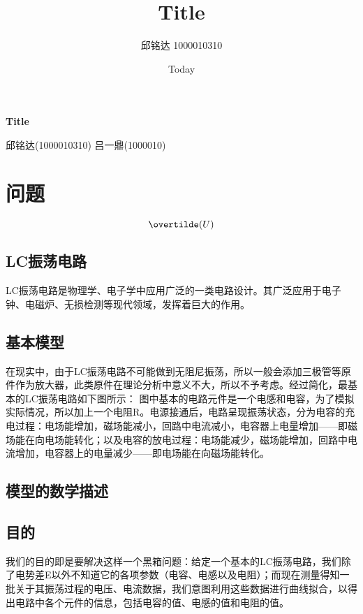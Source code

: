 \documentclass[a4paper]{article}
\begin{document}
\title{Title}
\author{邱铭达 1000010310}
\date{Today}

%
%
\begin{center}
	\Huge \textbf{Title}
\end{center}
\vspace{1 in}
\begin{center}
	\normalsize 邱铭达(1000010310) 吕一鼎(1000010)
\end{center}
\newpage


\tableofcontents

\section{问题}
\begin{equation}
	\overtilde(U)
\end{equation}

\subsection{LC振荡电路}
	LC振荡电路是物理学、电子学中应用广泛的一类电路设计。其广泛应用于电子钟、电磁炉、无损检测等现代领域，发挥着巨大的作用。
\subsection{基本模型}
	在现实中，由于LC振荡电路不可能做到无阻尼振荡，所以一般会添加三极管等原件作为放大器，此类原件在理论分析中意义不大，所以不予考虑。经过简化，最基本的LC振荡电路如下图所示： 图中基本的电路元件是一个电感和电容，为了模拟实际情况，所以加上一个电阻R。电源接通后，电路呈现振荡状态，分为电容的充电过程：电场能增加，磁场能减小，回路中电流减小，电容器上电量增加——即磁场能在向电场能转化；以及电容的放电过程：电场能减少，磁场能增加，回路中电流增加，电容器上的电量减少——即电场能在向磁场能转化。
\subsection{模型的数学描述}

\subsection{目的}

	我们的目的即是要解决这样一个黑箱问题：给定一个基本的LC振荡电路，我们除了电势差E以外不知道它的各项参数（电容、电感以及电阻）；而现在测量得知一批关于其振荡过程的电压、电流数据，我们意图利用这些数据进行曲线拟合，以得出电路中各个元件的信息，包括电容的值、电感的值和电阻的值。
\end{document}
